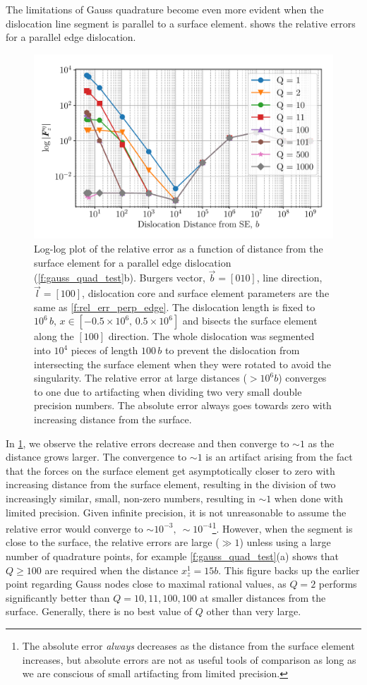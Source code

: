 \documentclass[11pt]{iopart}
\begin{document}
The limitations of Gauss quadrature become even more evident when the dislocation line segment is parallel to a surface element.  shows the relative errors for a parallel edge dislocation.
\begin{figure}
    \centering
    \includegraphics[width=0.8\linewidth]{par_e_z.pdf}
    \caption{Log-log plot of the relative error as a function of distance from the surface element for a parallel edge dislocation (\cref{f:gauss_quad_test}b). Burgers vector, $\vec{b} = [0 1 0]$, line direction, $\vec{l} = [1 0 0]$, dislocation core and surface element parameters are the same as \cref{f:rel_err_perp_edge}. The dislocation length is fixed to $10^{6}\, b,\, x\in\left[-0.5\times10^{6},\, 0.5\times10^{6} \right]$ and bisects the surface element along the $[1 0 0]$ direction. The whole dislocation was segmented into $10^4$ pieces of length $100\, b$ to prevent the dislocation from intersecting the surface element when they were rotated to avoid the singularity. The relative error at large distances ($>10^6 b$) converges to one due to artifacting when dividing two very small double precision numbers. The absolute error always goes towards zero with increasing distance from the surface.}
    \label{f:rel_err_par_edge}
\end{figure}
In \cref{f:rel_err_par_edge}, we observe the relative errors decrease and then converge to $\sim 1$ as the distance grows larger. The convergence to $\sim 1$ is an artifact arising from the fact that the forces on the surface element get asymptotically closer to zero with increasing distance from the surface element, resulting in the division of two increasingly similar, small, non-zero numbers, resulting in $\sim 1$ when done with limited precision. Given infinite precision, it is not unreasonable to assume the relative error would converge to $\sim10^{-3},~ \sim10^{-4}$\footnote[1]{The absolute error \textit{always} decreases as the distance from the surface element increases, but absolute errors are not as useful tools of comparison as long as we are conscious of small artifacting from limited precision.}. However, when the segment is close to the surface, the relative errors are large ($\gg1$) unless using a large number of quadrature points, for example \cref{f:gauss_quad_test}(a) shows that $Q\geq100$ are required when the distance $x^1_z = 15b$. This figure backs up the earlier point regarding Gauss nodes close to maximal rational values, as $Q = 2$ performs significantly better than $Q = 10, 11, 100, 100$ at smaller distances from the surface. Generally, there is no best value of $Q$ other than very large.
\end{document}

